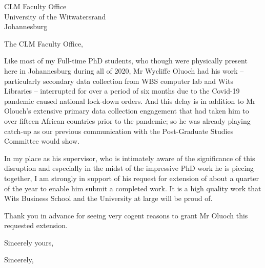 \documentclass[11pt,]{letter}
\begin{document}
\begin{letter}{CLM Faculty Office\\University of the
Witwatersrand\\Johannesburg}
\opening{The CLM Faculty Office,}

Like most of my Full-time PhD students, who though were physically
present here in Johannesburg during all of 2020, Mr Wycliffe Oluoch had
his work -- particularly secondary data collection from WBS computer lab
and Wits Libraries -- interrupted for over a period of six months due to
the Covid-19 pandemic caused national lock-down orders. And this delay
is in addition to Mr Olouch's extensive primary data collection
engagement that had taken him to over fifteen African countries prior to
the pandemic; so he was already playing catch-up as our previous
communication with the Post-Graduate Studies Committee would show.

In my place as his supervisor, who is intimately aware of the
significance of this disruption and especially in the midst of the
impressive PhD work he is piecing together, I am strongly in support of
his request for extension of about a quarter of the year to enable him
submit a completed work. It is a high quality work that Wits Business
School and the University at large will be proud of.

Thank you in advance for seeing very cogent reasons to grant Mr Oluoch
this requested extension.

Sincerely yours,

\longindentation=0pt
\closing{Sincerely,}

\end{letter}
\end{document}

